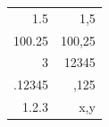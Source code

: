 \documentclass{article}
\begin{document}
\begin{tabular}{D{.}{.}{-1}D{,}{\cdot}{-1}}
1.5 & 1,5 \\
100.25 & 100,25 \\
3 & 12345 \\
.12345 & ,125 \\
1.2.3 & x,y
\end{tabular}
\end{document}
